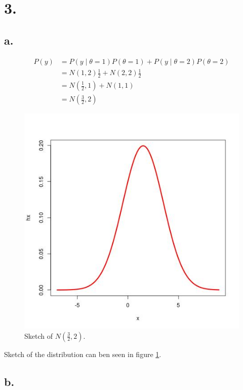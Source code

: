 \documentclass[11pt]{amsart}
\begin{document}
\section*{3.}
\subsection*{a.}

\begin{equation*}
    \begin{aligned}
        P(y)
        &= P(y \mid \theta = 1) P(\theta = 1) + P(y \mid \theta = 2) P(\theta = 2) \\
        &= N(1, 2)\frac{1}{2} + N(2, 2)\frac{1}{2} \\
        &= N(\frac{1}{2}, 1) + N(1, 1) \\
        &= N(\frac{3}{2}, 2)
    \end{aligned}
\end{equation*}

\begin{figure}[ht!]
  \includegraphics[width=\linewidth]{3-a}
  \caption{Sketch of $N(\frac{3}{2}, 2)$.}
  \label{fig:3-a}
\end{figure}

Sketch of the distribution can ben seen in figure \ref{fig:3-a}.

\subsection*{b.}
\end{document}
